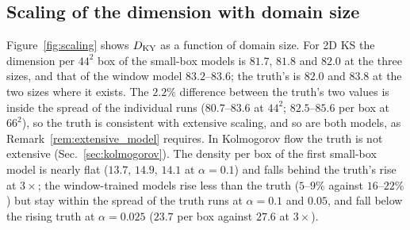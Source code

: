 \subsection{Scaling of the dimension with domain size}
\label{sec:scaling}

Figure~\ref{fig:scaling} shows $D_{\mathrm{KY}}$ as a function of domain size. For 2D
KS the dimension per $44^2$ box of the small-box models is $81.7$, $81.8$ and
$82.0$ at the three sizes, and that of the window model $83.2$--$83.6$; the
truth's is $82.0$ and $83.8$ at the two sizes where it exists. The $2.2\%$
difference between the truth's two values is inside the spread of the
individual runs ($80.7$--$83.6$ at $44^2$; $82.5$--$85.6$ per box at $66^2$),
so the truth is consistent with extensive scaling, and so are both models,
as Remark~\ref{rem:extensive_model} requires. In Kolmogorov flow the truth
is not extensive (Sec.~\ref{sec:kolmogorov}). The density per box of the
first small-box model is nearly flat ($13.7$, $14.9$, $14.1$ at $\alpha=0.1$)
and falls behind the truth's rise at $3\times$; the window-trained models
rise less than the truth ($5$--$9\%$ against $16$--$22\%$) but stay within the
spread of the truth runs at $\alpha=0.1$ and $0.05$, and fall below the
rising truth at $\alpha=0.025$ ($23.7$ per box against $27.6$ at $3\times$).

